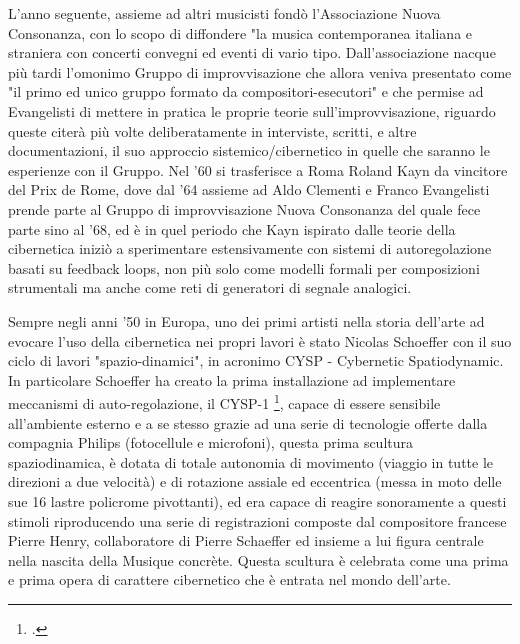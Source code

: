 L'anno seguente, assieme ad altri musicisti
fondò l'Associazione Nuova Consonanza, con lo scopo di diffondere
"la musica contemporanea italiana e straniera con concerti convegni ed eventi di vario tipo.
Dall'associazione nacque più tardi l'omonimo Gruppo di improvvisazione
che allora veniva presentato come "il primo ed unico gruppo formato da compositori-esecutori"
e che permise ad Evangelisti di mettere in pratica le proprie teorie sull'improvvisazione,
riguardo queste citerà più volte deliberatamente in interviste, scritti,
e altre documentazioni, il suo approccio sistemico/cibernetico
in quelle che saranno le esperienze con il Gruppo.
Nel '60 si trasferisce a Roma Roland Kayn da vincitore del Prix de Rome,
dove dal '64 assieme ad Aldo Clementi e Franco Evangelisti
prende parte al Gruppo di improvvisazione Nuova Consonanza
del quale fece parte sino al '68,
ed è in quel periodo che Kayn ispirato dalle teorie della cibernetica iniziò a sperimentare
estensivamente con sistemi di autoregolazione basati su feedback loops,
non più solo come modelli formali per composizioni strumentali
ma anche come reti di generatori di segnale analogici.

Sempre negli anni '50 in Europa, uno dei primi artisti nella storia dell'arte
ad evocare l'uso della cibernetica nei propri lavori è stato
Nicolas Schoeffer con il suo ciclo di lavori "spazio-dinamici", in acronimo
CYSP - Cybernetic Spatiodynamic.
In particolare Schoeffer ha creato la prima installazione ad implementare meccanismi
di auto-regolazione, il CYSP-1 \footcite{sanfilippovallefeedsys},
capace di essere sensibile all'ambiente esterno e a se stesso
grazie ad una serie di tecnologie offerte dalla compagnia Philips (fotocellule e microfoni),
questa prima scultura spaziodinamica, è dotata di totale autonomia di movimento
(viaggio in tutte le direzioni a due velocità) e di rotazione assiale ed eccentrica
(messa in moto delle sue 16 lastre policrome pivottanti),
ed era capace di reagire sonoramente a questi stimoli riproducendo
una serie di registrazioni composte dal compositore francese Pierre Henry,
collaboratore di Pierre Schaeffer ed insieme a lui figura centrale nella nascita della Musique concrète.
Questa scultura è celebrata come una prima e prima opera di carattere cibernetico
che è entrata nel mondo dell'arte.

